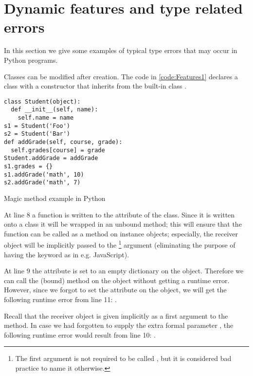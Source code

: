 \section{Dynamic features and type related errors}
\label{Features}
In this section we give some examples of typical type errors that may occur in Python programs.

Classes can be modified after creation. The code in \autoref{code:Features1} declares a class  with a constructor that inherits from the built-in class .

\begin{listing}[H]
  \begin{verbatim}
class Student(object):
  def __init__(self, name):
    self.name = name
s1 = Student('Foo')
s2 = Student('Bar')
def addGrade(self, course, grade):
  self.grades[course] = grade
Student.addGrade = addGrade
s1.grades = {}
s1.addGrade('math', 10)
s2.addGrade('math', 7)
  \end{verbatim}
  \caption{Magic method example in Python}
  \label{code:Features1}
\end{listing}

At line 8 a function  is written to the  attribute of the  class. Since it is written onto a class it will be wrapped in an unbound method; this will ensure that the function can be called as a method on instance objects; especially, the receiver object will be implicitly passed to the \footnote{The first argument is not required to be called , but it is considered bad practice to name it otherwise.} argument (eliminating the purpose of having the  keyword as in e.g. JavaScript).

At line 9 the attribute  is set to an empty dictionary on the  object. Therefore we can call the (bound) method  on the  object without getting a runtime error. However, since we forgot to set the  attribute on the  object, we will get the following runtime error from line 11: . 

Recall that the receiver object is given implicitly as a first argument to the  method. 
In case we had forgotten to supply the extra formal parameter , the following runtime error would result from line 10:
. 

